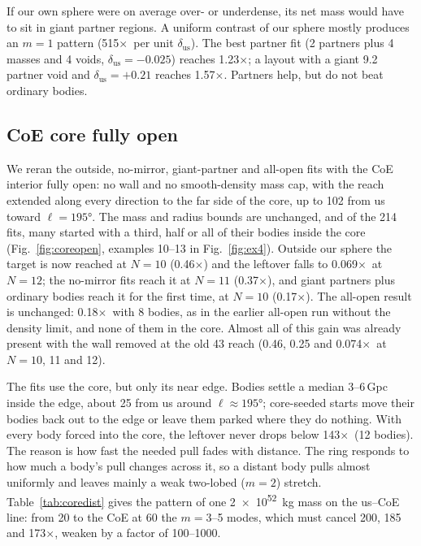 \documentclass[aps,prd,twocolumn,nofootinbib,superscriptaddress,floatfix]{revtex4-2}
\newcommand{\fl}{\ensuremath{\times}}
\begin{document}
If our own sphere were on average over- or underdense, its net mass would have to sit in giant partner regions. A uniform contrast of our sphere mostly produces an $m=1$ pattern (515\fl\ per unit $\delta_\mathrm{us}$). The best partner fit (2 partners plus 4 masses and 4 voids, $\delta_\mathrm{us}=-0.025$) reaches 1.23\fl; a layout with a giant \SI{9.2}{\Gpc} partner void and $\delta_\mathrm{us}=+0.21$ reaches 1.57\fl. Partners help, but do not beat ordinary bodies.

\subsection{CoE core fully open}\label{sec:coreopen}
We reran the outside, no-mirror, giant-partner and all-open fits with the CoE interior fully open: no wall and no smooth-density mass cap, with the reach extended along every direction to the far side of the core, up to \SI{102}{\Gpc} from us toward $\ell=\ang{195}$. The mass and radius bounds are unchanged, and of the 214 fits, many started with a third, half or all of their bodies inside the core (Fig.~\ref{fig:coreopen}, examples 10--13 in Fig.~\ref{fig:ex4}). Outside our sphere the target is now reached at $N=10$ (0.46\fl) and the leftover falls to 0.069\fl\ at $N=12$; the no-mirror fits reach it at $N=11$ (0.37\fl), and giant partners plus ordinary bodies reach it for the first time, at $N=10$ (0.17\fl). The all-open result is unchanged: 0.18\fl\ with 8 bodies, as in the earlier all-open run without the density limit, and none of them in the core. Almost all of this gain was already present with the wall removed at the old \SI{43}{\Gpc} reach (0.46, 0.25 and 0.074\fl\ at $N=10$, 11 and 12).

The fits use the core, but only its near edge. Bodies settle a median 3--6\,Gpc inside the edge, about \SI{25}{\Gpc} from us around $\ell\approx\ang{195}$; core-seeded starts move their bodies back out to the edge or leave them parked where they do nothing. With every body forced into the core, the leftover never drops below 143\fl\ (12 bodies). The reason is how fast the needed pull fades with distance. The ring responds to how much a body's pull changes across it, so a distant body pulls almost uniformly and leaves mainly a weak two-lobed ($m=2$) stretch. Table~\ref{tab:coredist} gives the pattern of one \SI{2e52}{\kilo\gram} mass on the us--CoE line: from \SI{20}{\Gpc} to the CoE at \SI{60}{\Gpc} the $m=3$--5 modes, which must cancel 200, 185 and 173\fl, weaken by a factor of 100--1000.
\end{document}
